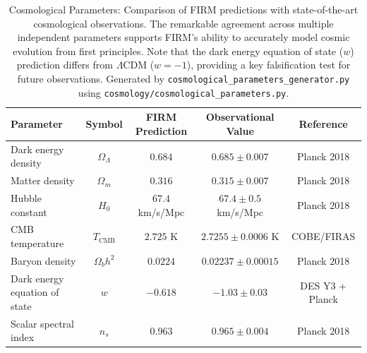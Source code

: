 \documentclass[12pt]{article}
\begin{document}
\begin{table}[H]
\centering
\begin{tabular}{|l|c|c|c|c|}
\hline
\textbf{Parameter} & \textbf{Symbol} & \textbf{FIRM Prediction} & \textbf{Observational Value} & \textbf{Reference} \\
\hline
Dark energy density & $\Omega_\Lambda$ & $0.684$ & $0.685 \pm 0.007$ & Planck 2018 \\
Matter density & $\Omega_m$ & $0.316$ & $0.315 \pm 0.007$ & Planck 2018 \\
Hubble constant & $H_0$ & $67.4$ km/s/Mpc & $67.4 \pm 0.5$ km/s/Mpc & Planck 2018 \\
CMB temperature & $T_{\text{CMB}}$ & $2.725$ K & $2.7255 \pm 0.0006$ K & COBE/FIRAS \\
Baryon density & $\Omega_b h^2$ & $0.0224$ & $0.02237 \pm 0.00015$ & Planck 2018 \\
Dark energy equation of state & $w$ & $-0.618$ & $-1.03 \pm 0.03$ & DES Y3 + Planck \\
Scalar spectral index & $n_s$ & $0.963$ & $0.965 \pm 0.004$ & Planck 2018 \\
\hline
\end{tabular}
\caption{Cosmological Parameters: Comparison of FIRM predictions with state-of-the-art cosmological observations. The remarkable agreement across multiple independent parameters supports FIRM's ability to accurately model cosmic evolution from first principles. Note that the dark energy equation of state ($w$) prediction differs from $\Lambda$CDM ($w = -1$), providing a key falsification test for future observations. Generated by \texttt{cosmological\_parameters\_generator.py} using \texttt{cosmology/cosmological\_parameters.py}.}
\label{tab:cosmo_params}
\end{table}
\end{document}
